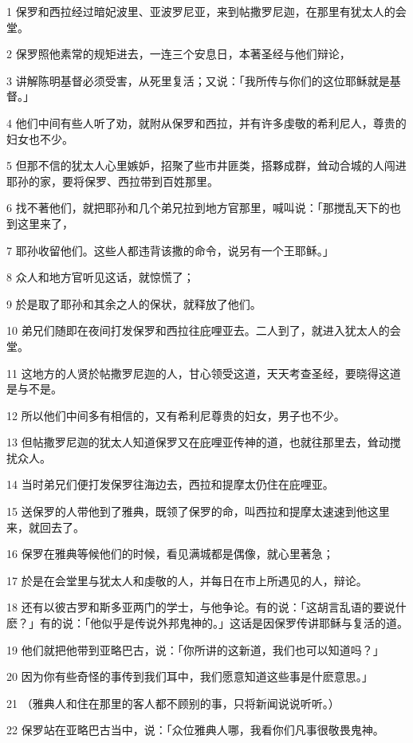 \par 1 保罗和西拉经过暗妃波里、亚波罗尼亚，来到帖撒罗尼迦，在那里有犹太人的会堂。
\par 2 保罗照他素常的规矩进去，一连三个安息日，本著圣经与他们辩论，
\par 3 讲解陈明基督必须受害，从死里复活；又说：「我所传与你们的这位耶稣就是基督。」
\par 4 他们中间有些人听了劝，就附从保罗和西拉，并有许多虔敬的希利尼人，尊贵的妇女也不少。
\par 5 但那不信的犹太人心里嫉妒，招聚了些市井匪类，搭夥成群，耸动合城的人闯进耶孙的家，要将保罗、西拉带到百姓那里。
\par 6 找不著他们，就把耶孙和几个弟兄拉到地方官那里，喊叫说：「那搅乱天下的也到这里来了，
\par 7 耶孙收留他们。这些人都违背该撒的命令，说另有一个王耶稣。」
\par 8 众人和地方官听见这话，就惊慌了；
\par 9 於是取了耶孙和其余之人的保状，就释放了他们。
\par 10 弟兄们随即在夜间打发保罗和西拉往庇哩亚去。二人到了，就进入犹太人的会堂。
\par 11 这地方的人贤於帖撒罗尼迦的人，甘心领受这道，天天考查圣经，要晓得这道是与不是。
\par 12 所以他们中间多有相信的，又有希利尼尊贵的妇女，男子也不少。
\par 13 但帖撒罗尼迦的犹太人知道保罗又在庇哩亚传神的道，也就往那里去，耸动搅扰众人。
\par 14 当时弟兄们便打发保罗往海边去，西拉和提摩太仍住在庇哩亚。
\par 15 送保罗的人带他到了雅典，既领了保罗的命，叫西拉和提摩太速速到他这里来，就回去了。
\par 16 保罗在雅典等候他们的时候，看见满城都是偶像，就心里著急；
\par 17 於是在会堂里与犹太人和虔敬的人，并每日在市上所遇见的人，辩论。
\par 18 还有以彼古罗和斯多亚两门的学士，与他争论。有的说：「这胡言乱语的要说什麽？」有的说：「他似乎是传说外邦鬼神的。」这话是因保罗传讲耶稣与复活的道。
\par 19 他们就把他带到亚略巴古，说：「你所讲的这新道，我们也可以知道吗？」
\par 20 因为你有些奇怪的事传到我们耳中，我们愿意知道这些事是什麽意思。」
\par 21 （雅典人和住在那里的客人都不顾别的事，只将新闻说说听听。）
\par 22 保罗站在亚略巴古当中，说：「众位雅典人哪，我看你们凡事很敬畏鬼神。

